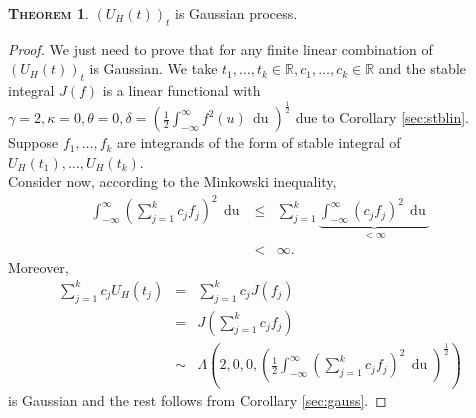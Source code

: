 \documentclass[a4paper, twoside, 11pt]{article}
\theoremstyle{definition}
\newtheorem{theorem}[definition]{\scshape Theorem}
\begin{document}
\begin{theorem}
  $(U_H(t))_{t}$ is Gaussian process.
\end{theorem}

\begin{proof}
  We just need to prove that for any finite linear combination of $(U_H(t))_t$ is Gaussian. We take $t_1, \dots, t_k \in \mathbb{R}, c_1, \dots, c_k \in \mathbb{R}$ and the stable integral $J(f) $ is a linear functional with $\gamma=2, \kappa=0, \theta=0, \delta= (\frac{1}{2}\int_{-\infty}^{\infty}f^2(u)\,\mathop{du})^{\frac{1}{2}}$ due to Corollary \ref{sec:stblin}. Suppose $f_1,\dots, f_k$ are integrands of the form of stable integral of $U_H(t_1), \dots, U_H(t_k)$. \\
  Consider now, according to the Minkowski inequality,
  \begin{eqnarray*}
	\int_{-\infty}^{\infty}(\sum_{j=1}^k c_jf_j)^2\,\mathop{du} &\le& \sum_{j=1}^k \underbrace{\int_{-\infty}^{\infty}(c_jf_j)^2\,\mathop{du}}_{<\infty}\\
	&<& \infty.
  \end{eqnarray*}
Moreover,
  \begin{eqnarray*}
	\sum_{j=1}^k c_jU_H(t_j) &=& \sum_{j=1}^k c_jJ(f_j)\\
	&=& J(\sum_{j=1}^k c_jf_j)\\
	&\sim& \Lambda(2, 0, 0, (\frac{1}{2}\int_{-\infty}^{\infty}(\sum_{j=1}^k c_jf_j)^2\,\mathop{du})^{\frac{1}{2}})
  \end{eqnarray*}
  is Gaussian and the rest follows from Corollary \ref{sec:gauss}.
\end{proof}
\end{document}
